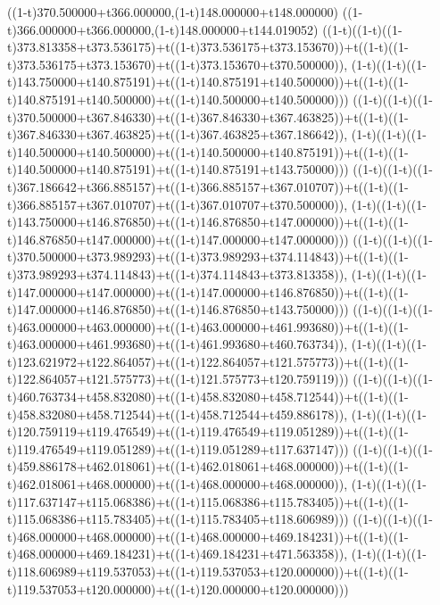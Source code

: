 ((1-t)370.500000+t366.000000,(1-t)148.000000+t148.000000)
((1-t)366.000000+t366.000000,(1-t)148.000000+t144.019052)
((1-t)((1-t)((1-t)373.813358+t373.536175)+t((1-t)373.536175+t373.153670))+t((1-t)((1-t)373.536175+t373.153670)+t((1-t)373.153670+t370.500000)),                                     (1-t)((1-t)((1-t)143.750000+t140.875191)+t((1-t)140.875191+t140.500000))+t((1-t)((1-t)140.875191+t140.500000)+t((1-t)140.500000+t140.500000)))
((1-t)((1-t)((1-t)370.500000+t367.846330)+t((1-t)367.846330+t367.463825))+t((1-t)((1-t)367.846330+t367.463825)+t((1-t)367.463825+t367.186642)),                                     (1-t)((1-t)((1-t)140.500000+t140.500000)+t((1-t)140.500000+t140.875191))+t((1-t)((1-t)140.500000+t140.875191)+t((1-t)140.875191+t143.750000)))
((1-t)((1-t)((1-t)367.186642+t366.885157)+t((1-t)366.885157+t367.010707))+t((1-t)((1-t)366.885157+t367.010707)+t((1-t)367.010707+t370.500000)),                                     (1-t)((1-t)((1-t)143.750000+t146.876850)+t((1-t)146.876850+t147.000000))+t((1-t)((1-t)146.876850+t147.000000)+t((1-t)147.000000+t147.000000)))
((1-t)((1-t)((1-t)370.500000+t373.989293)+t((1-t)373.989293+t374.114843))+t((1-t)((1-t)373.989293+t374.114843)+t((1-t)374.114843+t373.813358)),                                     (1-t)((1-t)((1-t)147.000000+t147.000000)+t((1-t)147.000000+t146.876850))+t((1-t)((1-t)147.000000+t146.876850)+t((1-t)146.876850+t143.750000)))
((1-t)((1-t)((1-t)463.000000+t463.000000)+t((1-t)463.000000+t461.993680))+t((1-t)((1-t)463.000000+t461.993680)+t((1-t)461.993680+t460.763734)),                                     (1-t)((1-t)((1-t)123.621972+t122.864057)+t((1-t)122.864057+t121.575773))+t((1-t)((1-t)122.864057+t121.575773)+t((1-t)121.575773+t120.759119)))
((1-t)((1-t)((1-t)460.763734+t458.832080)+t((1-t)458.832080+t458.712544))+t((1-t)((1-t)458.832080+t458.712544)+t((1-t)458.712544+t459.886178)),                                     (1-t)((1-t)((1-t)120.759119+t119.476549)+t((1-t)119.476549+t119.051289))+t((1-t)((1-t)119.476549+t119.051289)+t((1-t)119.051289+t117.637147)))
((1-t)((1-t)((1-t)459.886178+t462.018061)+t((1-t)462.018061+t468.000000))+t((1-t)((1-t)462.018061+t468.000000)+t((1-t)468.000000+t468.000000)),                                     (1-t)((1-t)((1-t)117.637147+t115.068386)+t((1-t)115.068386+t115.783405))+t((1-t)((1-t)115.068386+t115.783405)+t((1-t)115.783405+t118.606989)))
((1-t)((1-t)((1-t)468.000000+t468.000000)+t((1-t)468.000000+t469.184231))+t((1-t)((1-t)468.000000+t469.184231)+t((1-t)469.184231+t471.563358)),                                     (1-t)((1-t)((1-t)118.606989+t119.537053)+t((1-t)119.537053+t120.000000))+t((1-t)((1-t)119.537053+t120.000000)+t((1-t)120.000000+t120.000000)))

